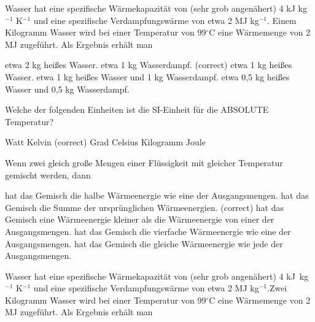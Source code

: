 \documentclass[11pt]{exam}
\begin{document}
\setlength{\voffset}{-0.5in}
\setlength{\headsep}{5pt}

\hspace{2mm}
 \hspace{5mm}
\vspace{4mm}

\begin{questions}

\question Wasser hat eine spezifische Wärmekapazität von (sehr grob angenähert) 4 kJ kg\(^{-1}\) K\(^{-1}\) und eine spezifische Verdampfungswärme von etwa 2 MJ kg\(^{-1}\). Einem Kilogramm Wasser wird bei einer Temperatur von 99\(^\circ\)C eine Wärmemenge von 2 MJ zugeführt. Als Ergebnis erhält man

\begin{choices}
	\choice etwa 2 kg heißes Wasser.
	\choice etwa 1 kg Wasserdampf. (correct)
	\choice etwa 1 kg heißes Wasser.
	\choice etwa 1 kg heißes Wasser und 1 kg Wasserdampf.
	\choice etwa 0,5 kg heißes Wasser und 0,5 kg Wasserdampf.
\end{choices}

\vspace{3mm}\question Welche der folgenden Einheiten ist die SI-Einheit für die ABSOLUTE Temperatur?

\begin{choices}
	\choice Watt
	\choice Kelvin (correct)
	\choice Grad Celsius
	\choice Kilogramm
	\choice Joule
\end{choices}

\vspace{3mm}\question Wenn zwei gleich große Mengen einer Flüssigkeit mit gleicher Temperatur gemischt werden, dann

\begin{choices}
	\choice hat das Gemisch die halbe Wärmeenergie wie eine der Ausgangsmengen.
	\choice hat das Gemisch die Summe der ursprünglichen Wärmeenergien. (correct)
	\choice hat das Gemisch eine Wärmeenergie kleiner als die Wärmeenergie von einer der Ausgangsmengen.
	\choice hat das Gemisch die vierfache Wärmeenergie wie eine der Ausgangsmengen.
	\choice hat das Gemisch die gleiche Wärmeenergie wie jede der Ausgangsmengen.
\end{choices}

\vspace{3mm}\question Wasser hat eine spezifische Wärmekapazität von (sehr grob angenähert) 4 kJ kg\(^{-1}\) K\(^{-1}\) und eine spezifische Verdampfungswärme von etwa 2 MJ kg\(^{-1}\).Zwei Kilogramm Wasser wird bei einer Temperatur von 99\(^\circ\)C eine Wärmemenge von 2 MJ zugeführt. Als Ergebnis erhält man


\end{questions}
\end{document}
